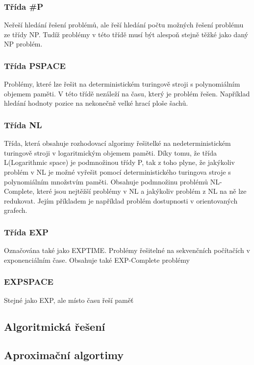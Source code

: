 \subsubsection{Třída \#P}
Neřeší hledání řešení problémů, ale řeší hledání počtu možných řešení problému ze třídy NP. Tudíž problémy v této třídě musí být alespoň stejně těžké jako
daný NP problém. 

\subsubsection{Třída PSPACE}
Problémy, které lze řešit na deterministickém turingově stroji s polynomiálním objemem paměti. V této třídě nezáleží na času, který je problém řešen.
Například hledání hodnoty pozice na nekonečně velké hrací ploše šachů.

\subsubsection{Třída NL}
Třída, která obsahuje rozhodovací algorimy řešitelké na nedeterministickém turingově stroji v logaritmickým objemem paměti. Díky tomu, že třída L(Logarithmic
space) je podmnožinou třídy P, tak z toho plyne, že jakýkoliv problém v NL je možné vyřešit pomocí deterministického turingova stroje s polynomiálním množstvím
paměti. Obsahuje podmnožinu problémů NL-Complete, které jsou nejtěžší problémy v NL a jakýkoliv problém z NL na ně lze redukovat. Jejím příkladem je například
problém dostupnosti v orientovaných grafech.

\subsubsection{Třída EXP}
Označována také jako EXPTIME. Problémy řešitelné na sekvenčních počítačích v exponenciálním čase. Obsahuje také EXP-Complete problémy

\subsubsection{EXPSPACE}
Stejné jako EXP, ale místo času řeší paměť

\subsection{Algoritmická řešení}

\subsection{Aproximační algortimy}
